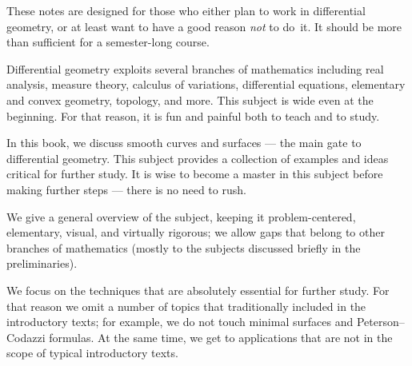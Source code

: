 \null\vfill{}


\thispagestyle{empty}
\newpage

\tableofcontents

\newpage

\thispagestyle{myheadings}

These notes are designed for those who either plan to work in differential geometry,
or at least want to have a good reason \emph{not} to do~it.
It should be more than sufficient for a semester-long course. 

Differential geometry exploits several branches of mathematics including 
real analysis, 
measure theory,
calculus of variations,
differential equations,
elementary and convex geometry,
topology, and more.
This subject is wide even at the beginning. 
For that reason, it is fun and painful both to teach and to study.

In this book, we discuss smooth curves and surfaces --- the main gate to differential geometry.
This subject provides a collection of examples and ideas critical for further study.
It is wise to become a master in this subject before making further steps --- there is no need to rush.

We give a general overview of the subject, keeping it
problem-centered,
elementary, 
visual, 
and virtually rigorous; we allow gaps that belong to other branches of mathematics (mostly to the subjects discussed briefly in the preliminaries).

We focus on the techniques that are absolutely essential for further study.
For  that reason we omit a number of topics that traditionally included in the introductory texts;
for example, we do not touch %
minimal surfaces and Peterson--Codazzi formulas.
At the same time, we get to applications
 that are not in the scope of typical introductory texts.
 
